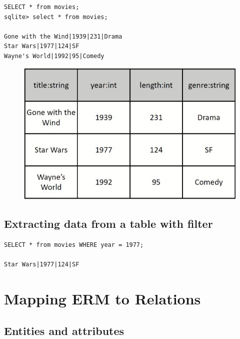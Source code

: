 \documentclass[conference]{IEEEtran}
\begin{document}
\begin{verbatim}
SELECT * from movies;
sqlite> select * from movies;

Gone with the Wind|1939|231|Drama
Star Wars|1977|124|SF
Wayne's World|1992|95|Comedy
\end{verbatim}
\begin{figure} [h!]
    \centering
    \includegraphics[scale=0.5]{Ex17.JPG}
\end{figure}

\subsection{Extracting data from a table with filter}

\begin{verbatim}
SELECT * from movies WHERE year = 1977;

Star Wars|1977|124|SF
\end{verbatim}

\section{\textbf{Mapping ERM to Relations}}
\subsection{Entities and attributes}
\end{document}
